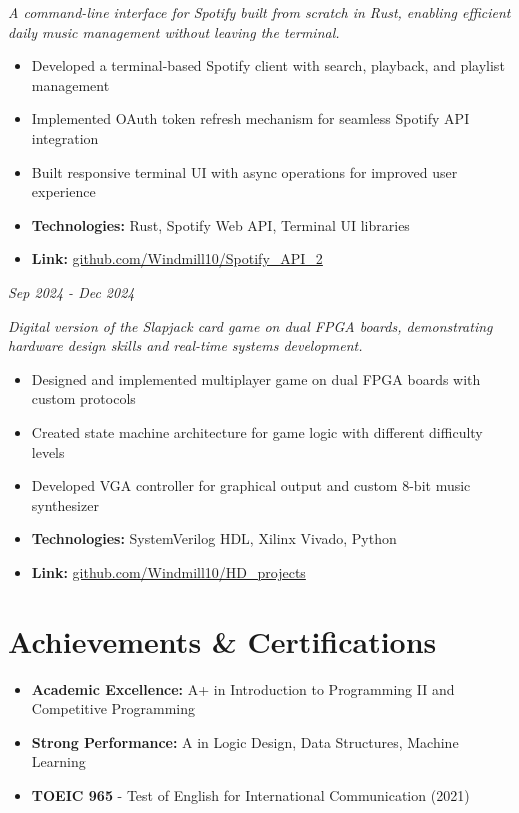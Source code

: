\documentclass[11pt,a4paper]{article}
\newcommand{\project}[1]{{\large\bfseries #1}}
\begin{document}
\begin{CJK}{UTF8}{bsmi}
\textit{A command-line interface for Spotify built from scratch in Rust, enabling efficient daily music management without leaving the terminal.}
\begin{itemize}[leftmargin=*]
    \item Developed a terminal-based Spotify client with search, playback, and playlist management
    \item Implemented OAuth token refresh mechanism for seamless Spotify API integration
    \item Built responsive terminal UI with async operations for improved user experience
    \item \textbf{Technologies:} Rust, Spotify Web API, Terminal UI libraries
    \item \textbf{Link:} \href{https://github.com/Windmill10/Spotify_API_2}{github.com/Windmill10/Spotify\_API\_2}
\end{itemize}

\vspace{0.3cm}
\noindent\project{Slapjack Card Game on FPGA} \hfill \textit{Sep 2024 - Dec 2024}
\vspace{0.3cm}

\textit{Digital version of the Slapjack card game on dual FPGA boards, demonstrating hardware design skills and real-time systems development.}
\begin{itemize}[leftmargin=*]
    \item Designed and implemented multiplayer game on dual FPGA boards with custom protocols
    \item Created state machine architecture for game logic with different difficulty levels
    \item Developed VGA controller for graphical output and custom 8-bit music synthesizer
    \item \textbf{Technologies:} SystemVerilog HDL, Xilinx Vivado, Python
    \item \textbf{Link:} \href{https://github.com/Windmill10/HD_projects}{github.com/Windmill10/HD\_projects}
\end{itemize}

\section{Achievements \& Certifications}
\begin{itemize}[leftmargin=*]
    \item \textbf{Academic Excellence:} A+ in Introduction to Programming II and Competitive Programming
    \item \textbf{Strong Performance:} A in Logic Design, Data Structures, Machine Learning
    \item \textbf{TOEIC 965} - Test of English for International Communication (2021)
\end{itemize}


\end{CJK}
\end{document}
